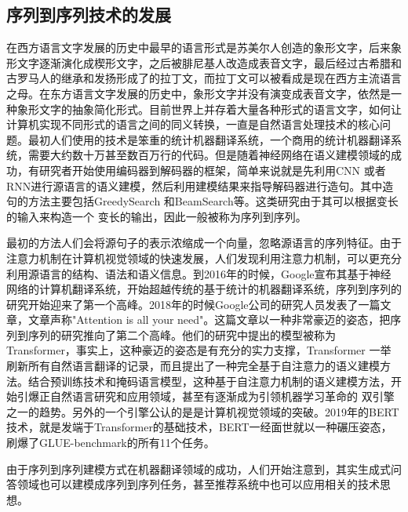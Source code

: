 \documentclass[twoside,a4paper,12pt]{book}%
\begin{document}
\subsection{序列到序列技术的发展}
在西方语言文字发展的历史中最早的语言形式是苏美尔人创造的象形文字，后来象形文字逐渐演化成楔形文字，之后被腓尼基人改造成表音文字，最后经过古希腊和古罗马人的继承和发扬形成了的拉丁文，而拉丁文可以被看成是现在西方主流语言之母。在东方语言文字发展的历史中，象形文字并没有演变成表音文字，依然是一种象形文字的抽象简化形式。目前世界上并存着大量各种形式的语言文字，如何让计算机实现不同形式的语言之间的同义转换，一直是自然语言处理技术的核心问题。最初人们使用的技术是笨重的统计机器翻译系统，一个商用的统计机器翻译系统，需要大约数十万甚至数百万行的代码。但是随着神经网络在语义建模领域的成功，有研究者开始使用编码器到解码器的框架，简单来说就是先利用\gls{CNN} 或者\gls{RNN}进行源语言的语义建模，然后利用建模结果来指导解码器进行造句。其中造句的方法主要包括GreedySearch 和BeamSearch等。这类研究由于其可以根据变长的输入来构造一个
变长的输出，因此一般被称为序列到序列。

最初的方法人们会将源句子的表示浓缩成一个向量，忽略源语言的序列特征。由于注意力机制在计算机视觉领域的快速发展，人们发现利用注意力机制，可以更充分利用源语言的结构、语法和语义信息。到2016年的时候，Google宣布其基于神经网络的计算机翻译系统，开始超越传统的基于统计的机器翻译系统，序列到序列的研究开始迎来了第一个高峰。2018年的时候Google公司的研究人员发表了一篇文章，文章声称"Attention is all your need"。这篇文章以一种非常豪迈的姿态，把序列到序列的研究推向了第二个高峰。他们的研究中提出的模型被称为Transformer，事实上，这种豪迈的姿态是有充分的实力支撑，Transformer 一举刷新所有自然语言翻译的记录，而且提出了一种完全基于自注意力的语义建模方法。结合预训练技术和掩码语言模型，这种基于自注意力机制的语义建模方法，开始引爆正自然语言研究和应用领域，甚至有逐渐成为引领机器学习革命的
双引擎之一的趋势。另外的一个引擎公认的是是计算机视觉领域的突破。2019年的\gls{BERT}技术，就是发端于Transformer的基础技术，\gls{BERT}一经面世就以一种碾压姿态，刷爆了GLUE-benchmark的所有11个任务。

由于序列到序列建模方式在机器翻译领域的成功，人们开始注意到，其实生成式问答领域也可以建模成序列到序列任务，甚至推荐系统中也可以应用相关的技术思想。
\end{document}
